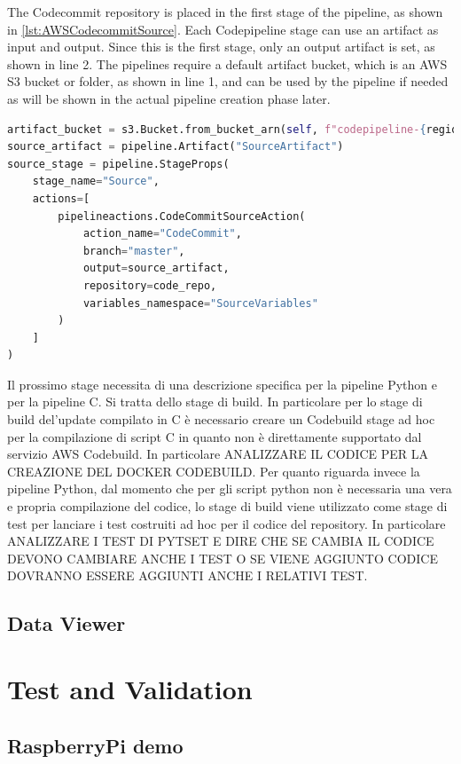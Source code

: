 The Codecommit repository is placed in the first stage of the pipeline, as shown in \ref{lst:AWSCodecommitSource}. Each Codepipeline stage can use an artifact as input and output. Since this is the first stage, only an output artifact is set, as shown in line 2. The pipelines require a default artifact bucket, which is an AWS S3 bucket or folder, as shown in line 1, and can be used by the pipeline if needed as will be shown in the actual pipeline creation phase later.
\begin{lstlisting}[language=Python, caption={CDK Code for the Codecommit source stage set up}, label=lst:AWSCodecommitSource]
artifact_bucket = s3.Bucket.from_bucket_arn(self, f"codepipeline-{region}-****", f"arn:aws:s3:::codepipeline-{region}-****") #default codepipeline bucket
source_artifact = pipeline.Artifact("SourceArtifact")
source_stage = pipeline.StageProps(
    stage_name="Source",
    actions=[
        pipelineactions.CodeCommitSourceAction(
            action_name="CodeCommit",
            branch="master",
            output=source_artifact,
            repository=code_repo,
            variables_namespace="SourceVariables"
        )
    ]
)
\end{lstlisting}
Il prossimo stage necessita di una descrizione specifica per la pipeline Python e per la pipeline C. Si tratta dello stage di build. In particolare per lo stage di build del'update compilato in C è necessario creare un Codebuild stage ad hoc per la compilazione di script C in quanto non è direttamente supportato dal servizio AWS Codebuild. In particolare ANALIZZARE IL CODICE PER LA CREAZIONE DEL DOCKER CODEBUILD.
Per quanto riguarda invece la pipeline Python, dal momento che per gli script python non è necessaria una vera e propria compilazione del codice, lo stage di build viene utilizzato come stage di test per lanciare i test costruiti ad hoc per il codice del repository. In particolare ANALIZZARE I TEST DI PYTSET E DIRE CHE SE CAMBIA IL CODICE DEVONO CAMBIARE ANCHE I TEST O SE VIENE AGGIUNTO CODICE DOVRANNO ESSERE AGGIUNTI ANCHE I RELATIVI TEST. 
\subsection{Data Viewer}

\section{Test and Validation}
\subsection{RaspberryPi demo}